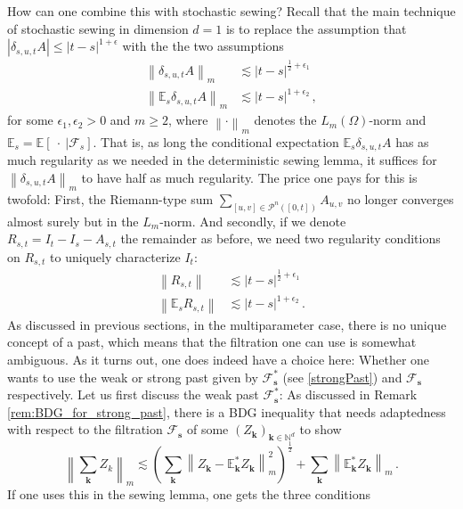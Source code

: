 \documentclass[11pt,oneside,english,reqno]{amsart}
\numberwithin{equation}{section}
\numberwithin{figure}{section}
\theoremstyle{plain}
\theoremstyle{definition}
\theoremstyle{remark}
\theoremstyle{plain}
\theoremstyle{plain}
\theoremstyle{plain}
\theoremstyle{plain}
\theoremstyle{plain}
\newcommand{\cF}{\mathcal{F}}
\newcommand{\cP}{\mathcal{P}}
\newcommand{\EE}{\mathbb{E}}
\newcommand{\NN}{\mathbb{N}}
\newcommand{\bk}{\mathbf{k}}
\newcommand{\bs}{\mathbf{s}}
\newcommand{\norm}[1]{\left\lVert #1\right\rVert}
\newcommand{\abs}[1]{\left\lvert #1\right\rvert}
\begin{document}
\noindent How can one combine this with stochastic sewing? Recall that the main technique of stochastic sewing in dimension $d=1$ is to replace the assumption that $\abs{\delta_{s,u,t} A} \le \abs{t-s}^{1+\epsilon}$ with the the two assumptions
%
\begin{align*}
    \norm{\delta_{s,u,t} A}_m &\lesssim \abs{t-s}^{\frac 12+\epsilon_1}\\
    \norm{\EE_s \delta_{s,u,t} A}_m &\lesssim \abs{t-s}^{1+\epsilon_2}\,,
\end{align*}
%
for some $\epsilon_1,\epsilon_2>0$ and $m\ge 2$, where $\norm{\cdot}_m$ denotes the $L_m(\Omega)$-norm and $\EE_s = \EE[~\cdot~\vert\cF_s]$. That is, as long the conditional expectation $\EE_s\delta_{s,u,t} A$ has as much regularity as we needed in the deterministic sewing lemma, it suffices for $\norm{\delta_{s,u,t} A}_m$ to have half as much regularity. The price one pays for this is twofold: First, the Riemann-type sum $\sum_{[u,v]\in\cP^n([0,t])} A_{u,v}$ no longer converges almost surely but in the $L_m$-norm. And secondly, if we denote $R_{s,t} = I_t-I_s-A_{s,t}$ the remainder as before, we need two regularity conditions on $R_{s,t}$ to uniquely characterize $I_t$:
%
\begin{align*}
    \norm{R_{s,t}}&\lesssim\abs{t-s}^{\frac 12+\epsilon_1}\\
    \norm{\EE_s R_{s,t}}&\lesssim\abs{t-s}^{1+\epsilon_2}\,.
\end{align*}
%
As discussed in previous sections, in the multiparameter case, there is no unique concept of a past, which means that the filtration one can use is somewhat ambiguous. As it turns out, one does indeed have a choice here: Whether one wants to use the weak or strong past given by $\cF^*_\bs$ (see \eqref{strongPast}) and $\cF_\bs$ respectively. Let us first discuss the weak past $\cF^*_\bs$: As discussed in Remark \ref{rem:BDG_for_strong_past}, there is a BDG inequality that needs adaptedness with respect to the filtration $\cF_\bs$ of some $(Z_\bk)_{\bk\in\NN^d}$ to show
%
\begin{equation*}
    \norm{\sum_{\bk}Z_k}_m\lesssim \left(\sum_{\bk}\norm{Z_\bk-\EE^*_\bk Z_\bk}_m^2\right)^{\frac 12} + \sum_{\bk} \norm{\EE^*_\bk Z_\bk}_m\,.
\end{equation*}
%
If one uses this in the sewing lemma, one gets the three conditions
%
\end{document}
